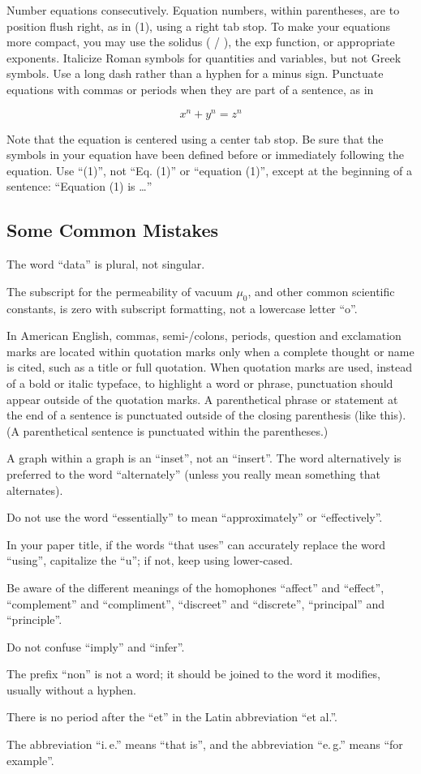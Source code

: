 \documentclass[conference,flushend]{iaria-lite}
\begin{document}
Number equations consecutively. Equation numbers, within parentheses, are to position flush right, as in (1), using a right tab stop. To make your equations more compact, you may use the solidus ( / ), the exp function, or appropriate exponents. Italicize Roman symbols for quantities and variables, but not Greek symbols. Use a long dash rather than a hyphen for a minus sign. Punctuate equations with commas or periods when they are part of a sentence, as in

\[ x^n + y^n = z^n \]

Note that the equation is centered using a center tab stop. Be sure that the symbols in your equation have been defined before or immediately following the equation. Use “(1)”, not “Eq. (1)” or “equation (1)”, except at the beginning of a sentence: “Equation (1) is \ldots”

\subsection{Some Common Mistakes}

\begin{compactitem}
\item The word “data” is plural, not singular.
\item The subscript for the permeability of vacuum $\mu_0$, and other common scientific constants, is zero with subscript formatting, not a lowercase letter “o”.
\item In American English, commas, semi-/colons, periods, question and exclamation marks are located within quotation marks only when a complete thought or name is cited, such as a title or full quotation. When quotation marks are used, instead of a bold or italic typeface, to highlight a word or phrase, punctuation should appear outside of the quotation marks. A parenthetical phrase or statement at the end of a sentence is punctuated outside of the closing parenthesis (like this). (A parenthetical sentence is punctuated within the parentheses.)
\item A graph within a graph is an “inset”, not an “insert”. The word alternatively is preferred to the word “alternately” (unless you really mean something that alternates).
\item Do not use the word “essentially” to mean “approximately” or “effectively”.
\item In your paper title, if the words “that uses” can accurately replace the word “using”, capitalize the “u”; if not, keep using lower-cased.
\item Be aware of the different meanings of the homophones “affect” and “effect”, “complement” and “compliment”, “discreet” and “discrete”, “principal” and “principle”.
\item Do not confuse “imply” and “infer”.
\item The prefix “non” is not a word; it should be joined to the word it modifies, usually without a hyphen.
\item There is no period after the “et” in the Latin abbreviation “et al.”.
\item The abbreviation “i.\,e.” means “that is”, and the abbreviation “e.\,g.” means “for example”.
\end{compactitem}
\end{document}
